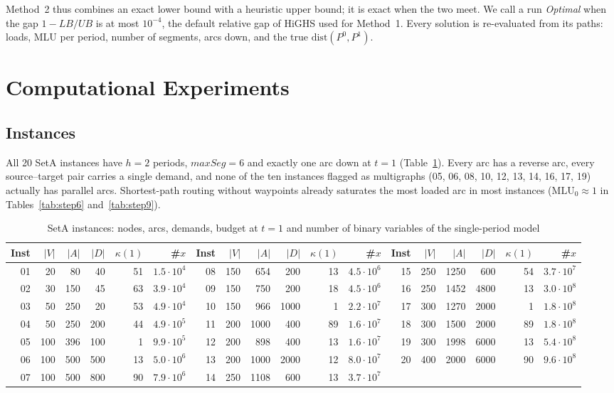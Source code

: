 \documentclass[conference]{IEEEtran}
\newcommand{\MLU}{\mathrm{MLU}}
\begin{document}
Method~2 thus combines an exact lower bound with a heuristic upper bound; it is exact when the two meet. We call a run \emph{Optimal} when the gap $1-LB/UB$ is at most $10^{-4}$, the default relative gap of HiGHS used for Method~1. Every solution is re-evaluated from its paths: loads, MLU per period, number of segments, arcs down, and the true $\mathrm{dist}(P^0,P^1)$.

\section{Computational Experiments}\label{sec:exp}

\subsection{Instances}
All 20 SetA instances have $h=2$ periods, $maxSeg=6$ and exactly one arc down at $t=1$ (Table~\ref{tab:inst}). Every arc has a reverse arc, every source--target pair carries a single demand, and none of the ten instances flagged as multigraphs (05, 06, 08, 10, 12, 13, 14, 16, 17, 19) actually has parallel arcs. Shortest-path routing without waypoints already saturates the most loaded arc in most instances ($\MLU_0\approx1$ in Tables~\ref{tab:step6} and~\ref{tab:step9}).

\begin{table}[t]
\centering\footnotesize
\caption{SetA instances: nodes, arcs, demands, budget at $t=1$ and number of binary variables of the single-period model}\label{tab:inst}
\setlength{\tabcolsep}{4pt}
\begin{tabular}{@{}rrrrrr@{\qquad}rrrrrr@{\qquad}rrrrrr@{}}
\toprule
Inst & $|V|$ & $|A|$ & $|D|$ & $\kappa(1)$ & \#$x$ & Inst & $|V|$ & $|A|$ & $|D|$ & $\kappa(1)$ & \#$x$ & Inst & $|V|$ & $|A|$ & $|D|$ & $\kappa(1)$ & \#$x$\\
\midrule
01 & 20 & 80 & 40 & 51 & $1.5\cdot10^4$ & 08 & 150 & 654 & 200 & 13 & $4.5\cdot10^6$ & 15 & 250 & 1250 & 600 & 54 & $3.7\cdot10^7$\\
02 & 30 & 150 & 45 & 63 & $3.9\cdot10^4$ & 09 & 150 & 750 & 200 & 18 & $4.5\cdot10^6$ & 16 & 250 & 1452 & 4800 & 13 & $3.0\cdot10^8$\\
03 & 50 & 250 & 20 & 53 & $4.9\cdot10^4$ & 10 & 150 & 966 & 1000 & 1 & $2.2\cdot10^7$ & 17 & 300 & 1270 & 2000 & 1 & $1.8\cdot10^8$\\
04 & 50 & 250 & 200 & 44 & $4.9\cdot10^5$ & 11 & 200 & 1000 & 400 & 89 & $1.6\cdot10^7$ & 18 & 300 & 1500 & 2000 & 89 & $1.8\cdot10^8$\\
05 & 100 & 396 & 100 & 1 & $9.9\cdot10^5$ & 12 & 200 & 898 & 400 & 13 & $1.6\cdot10^7$ & 19 & 300 & 1998 & 6000 & 13 & $5.4\cdot10^8$\\
06 & 100 & 500 & 500 & 13 & $5.0\cdot10^6$ & 13 & 200 & 1000 & 2000 & 12 & $8.0\cdot10^7$ & 20 & 400 & 2000 & 6000 & 90 & $9.6\cdot10^8$\\
07 & 100 & 500 & 800 & 90 & $7.9\cdot10^6$ & 14 & 250 & 1108 & 600 & 13 & $3.7\cdot10^7$ & & & & & & \\
\bottomrule
\end{tabular}
\end{table}
\end{document}
